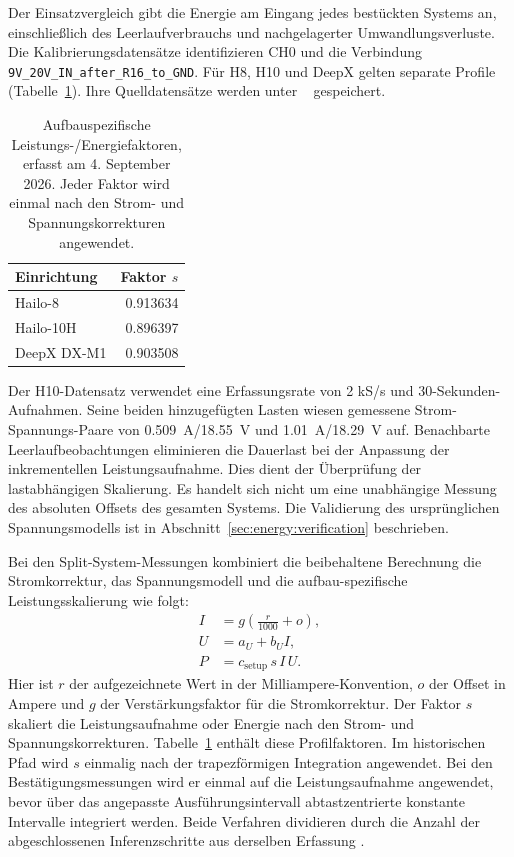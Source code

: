 Der Einsatzvergleich gibt die Energie am Eingang jedes bestückten Systems an, einschließlich des Leerlaufverbrauchs und nachgelagerter Umwandlungsverluste. Die Kalibrierungsdatensätze identifizieren CH0 und die Verbindung \texttt{9V\_20V\_IN\_after\_R16\_to\_GND}. Für H8, H10 und DeepX gelten separate Profile (Tabelle~\ref{tab:appendix:input_profiles}). Ihre Quelldatensätze werden unter ~\cite{edgeAIResults2026,v49Confirmation2026} gespeichert.

\begin{table}[!htb]
\centering\small\TableSetup
\caption{Aufbauspezifische Leistungs-/Energiefaktoren, erfasst am 4. September 2026. Jeder Faktor wird einmal nach den Strom- und Spannungskorrekturen angewendet.}
\label{tab:appendix:input_profiles}
\begin{tabular}{@{}lr@{}}
\toprule
Einrichtung & Faktor $s$ \\
\midrule
Hailo-8 & \num{0.913634} \\
Hailo-10H & \num{0.896397} \\
DeepX DX-M1 & \num{0.903508} \\
\bottomrule
\end{tabular}
\end{table}

Der H10-Datensatz verwendet eine Erfassungsrate von 2 kS/s und 30-Sekunden-Aufnahmen. Seine beiden hinzugefügten Lasten wiesen gemessene Strom-Spannungs-Paare von \num{0.509}~A/\num{18.55}~V und \num{1.01}~A/\num{18.29}~V auf. Benachbarte Leerlaufbeobachtungen eliminieren die Dauerlast bei der Anpassung der inkrementellen Leistungsaufnahme. Dies dient der Überprüfung der lastabhängigen Skalierung. Es handelt sich nicht um eine unabhängige Messung des absoluten Offsets des gesamten Systems. Die Validierung des ursprünglichen Spannungsmodells ist in Abschnitt~\ref{sec:energy:verification} beschrieben.

Bei den Split-System-Messungen kombiniert die beibehaltene Berechnung die Stromkorrektur, das Spannungsmodell und die aufbau-spezifische Leistungsskalierung wie folgt:
\begin{equation}
 \begin{aligned}
 I&=g\left(\frac{r}{1000}+o\right),\\
 U&=a_U+b_UI,\\
 P&=c_{\mathrm{setup}}\,s\,I\,U.
 \end{aligned}
 \label{eq:energy:split_calibration_chain}
\end{equation}
Hier ist $r$ der aufgezeichnete Wert in der Milliampere-Konvention, $o$ der Offset in Ampere und $g$ der Verstärkungsfaktor für die Stromkorrektur. Der Faktor $s$ skaliert die Leistungsaufnahme oder Energie nach den Strom- und Spannungskorrekturen. Tabelle~\ref{tab:appendix:input_profiles} enthält diese Profilfaktoren. Im historischen Pfad wird $s$ einmalig nach der trapezförmigen Integration angewendet. Bei den Bestätigungsmessungen wird er einmal auf die Leistungsaufnahme angewendet, bevor über das angepasste Ausführungsintervall abtastzentrierte konstante Intervalle integriert werden. Beide Verfahren dividieren durch die Anzahl der abgeschlossenen Inferenzschritte aus derselben Erfassung \cite{v49Confirmation2026}.


